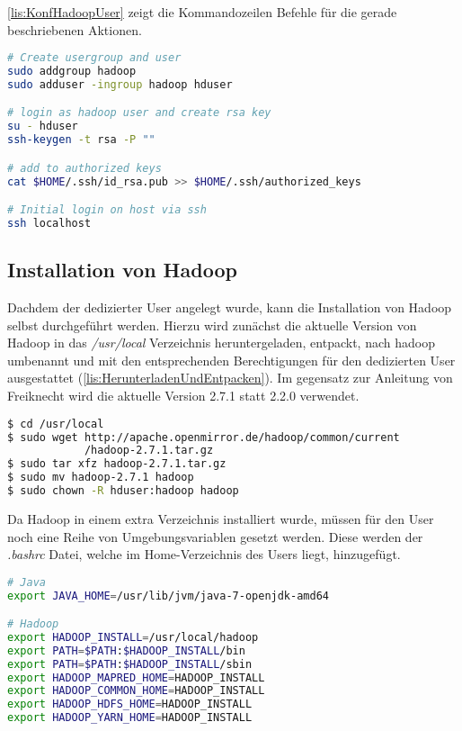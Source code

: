 \autoref{lis:KonfHadoopUser} zeigt die Kommandozeilen Befehle für die gerade beschriebenen Aktionen. \\

\begin{lstlisting}[language=bash, caption={Konfiguration des Hadoop Users}, label=lis:KonfHadoopUser]
# Create usergroup and user
sudo addgroup hadoop
sudo adduser -ingroup hadoop hduser

# login as hadoop user and create rsa key
su - hduser
ssh-keygen -t rsa -P ""

# add to authorized keys
cat $HOME/.ssh/id_rsa.pub >> $HOME/.ssh/authorized_keys

# Initial login on host via ssh
ssh localhost
\end{lstlisting}

\subsection{Installation von Hadoop}
Dachdem der dedizierter User angelegt wurde, kann die Installation von Hadoop selbst durchgeführt werden. Hierzu wird zunächst die aktuelle Version von Hadoop in das \textit{/usr/local} Verzeichnis heruntergeladen, entpackt, nach hadoop umbenannt und mit den entsprechenden Berechtigungen für den dedizierten User ausgestattet (\autoref{lis:HerunterladenUndEntpacken}). Im gegensatz zur Anleitung von Freiknecht wird die aktuelle Version 2.7.1 statt 2.2.0 verwendet. \\

\begin{lstlisting}[language=bash, caption={Herunterladen und entpacke von Hadoop}, label=lis:HerunterladenUndEntpacken]
$ cd /usr/local
$ sudo wget http://apache.openmirror.de/hadoop/common/current
            /hadoop-2.7.1.tar.gz
$ sudo tar xfz hadoop-2.7.1.tar.gz
$ sudo mv hadoop-2.7.1 hadoop
$ sudo chown -R hduser:hadoop hadoop
\end{lstlisting}

Da Hadoop in einem extra Verzeichnis installiert wurde, müssen für den User noch eine Reihe von Umgebungsvariablen gesetzt werden. Diese werden der \textit{.bashrc} Datei, welche im Home-Verzeichnis des Users liegt, hinzugefügt. \\

\begin{lstlisting}[language=bash, caption={Umgebungsvariablen für Hadoop}, label=lis:Umgebungsvariablen]
# Java
export JAVA_HOME=/usr/lib/jvm/java-7-openjdk-amd64

# Hadoop
export HADOOP_INSTALL=/usr/local/hadoop
export PATH=$PATH:$HADOOP_INSTALL/bin
export PATH=$PATH:$HADOOP_INSTALL/sbin
export HADOOP_MAPRED_HOME=HADOOP_INSTALL
export HADOOP_COMMON_HOME=HADOOP_INSTALL
export HADOOP_HDFS_HOME=HADOOP_INSTALL
export HADOOP_YARN_HOME=HADOOP_INSTALL
\end{lstlisting}

